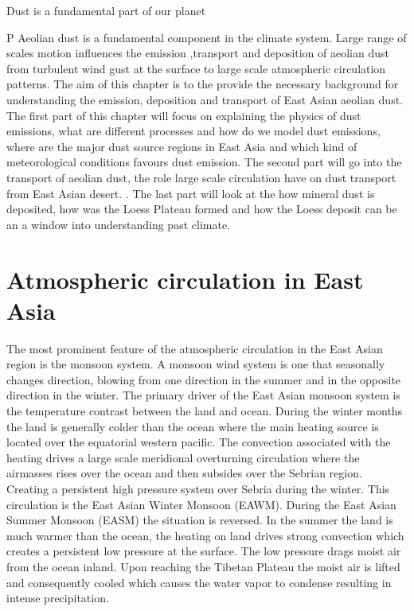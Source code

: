 Dust is a fundamental part of our planet  

P Aeolian dust is a fundamental component in the climate system. Large range of scales motion influences the emission 
,transport and deposition of aeolian dust from turbulent wind gust at the surface to large scale atmospheric circulation 
patterns. The aim of this chapter is to the provide the necessary background for understanding the emission, deposition 
and transport of East Asian aeolian dust. The first part of this chapter will focus on explaining the physics of dust 
emissions, what are different processes and how do we model dust emissions, where are the major dust source regions in 
East Asia and which kind of meteorological conditions favours dust emission. The second part will go into the transport 
of aeolian dust, the role large scale circulation have on dust transport from East Asian desert. . The last part will look at the how mineral dust is deposited, how was the 
Loess Plateau formed and how the Loess deposit can be an a window into understanding past climate.

\section{Atmospheric circulation in East Asia}
The most prominent feature of the atmospheric circulation in the East Asian region is the monsoon system. A monsoon wind system is one that seasonally changes direction, blowing from one direction in the summer and in the opposite direction in the winter.  The primary driver of the East Asian monsoon system is the temperature contrast between the land and ocean. During the winter months the land is generally colder than the ocean where the main heating source is located over the equatorial western pacific. The convection associated with the heating drives a large scale meridional overturning circulation where the airmasses rises over the ocean and then subsides over the Sebrian region. Creating a persistent high pressure system over Sebria during the winter. This circulation is the East Asian Winter Monsoon (EAWM). During the East Asian Summer Monsoon (EASM) the situation is reversed. In the summer the land is much warmer than the ocean, the heating on land drives strong convection which creates a persistent low pressure at the surface. The low pressure drags moist air from the ocean inland. Upon reaching the Tibetan Plateau the moist air is lifted and consequently cooled which causes the water vapor to condense resulting in intense precipitation. 

